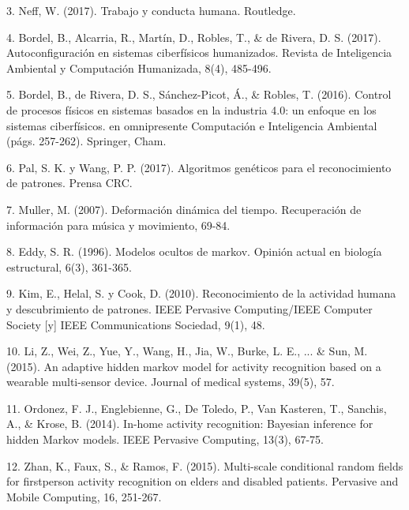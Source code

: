 \documentclass{paper}
\begin{document}
\bigskip
\bigskip

3. Neff, W. (2017). Trabajo y conducta humana. Routledge.

\bigskip
\bigskip

4. Bordel, B., Alcarria, R., Martín, D., Robles, T., & de Rivera, D. S. (2017). Autoconfiguración en sistemas ciberfísicos humanizados. Revista de Inteligencia Ambiental y Computación Humanizada, 8(4), 485-496.

\bigskip
\bigskip

5. Bordel, B., de Rivera, D. S., Sánchez-Picot, Á., & Robles, T. (2016). Control de procesos físicos en sistemas basados en la industria 4.0: un enfoque en los sistemas ciberfísicos. en omnipresente
Computación e Inteligencia Ambiental (págs. 257-262). Springer, Cham.

\bigskip
\bigskip

6. Pal, S. K. y Wang, P. P. (2017). Algoritmos genéticos para el reconocimiento de patrones. Prensa CRC.

\bigskip
\bigskip


7. Muller, M. (2007). Deformación dinámica del tiempo. Recuperación de información para música y movimiento, 69-84.

\bigskip
\bigskip

8. Eddy, S. R. (1996). Modelos ocultos de markov. Opinión actual en biología estructural, 6(3), 361-365.

\bigskip
\bigskip


9. Kim, E., Helal, S. y Cook, D. (2010). Reconocimiento de la actividad humana y descubrimiento de patrones. IEEE Pervasive Computing/IEEE Computer Society [y] IEEE Communications
Sociedad, 9(1), 48.

\bigskip
\bigskip

10. Li, Z., Wei, Z., Yue, Y., Wang, H., Jia, W., Burke, L. E., ... & Sun, M. (2015). An adaptive hidden markov model for activity recognition based on a wearable multi-sensor device. Journal of medical systems, 39(5), 57.

\bigskip
\bigskip

11. Ordonez, F. J., Englebienne, G., De Toledo, P., Van Kasteren, T., Sanchis, A., & Krose, B. (2014). In-home activity recognition: Bayesian inference for hidden Markov models. IEEE Pervasive Computing, 13(3), 67-75.

\bigskip
\bigskip

12. Zhan, K., Faux, S., & Ramos, F. (2015). Multi-scale conditional random fields for firstperson activity recognition on elders and disabled patients. Pervasive and Mobile Computing, 16, 251-267.
\end{document}
